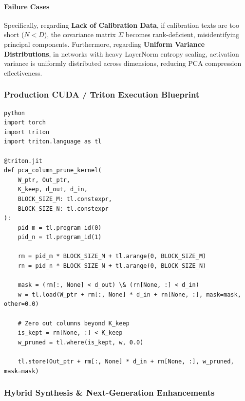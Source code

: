 \paragraph{Failure Cases}

Specifically, regarding \textbf{Lack of Calibration Data}, if calibration texts are too short ($N < D$), the covariance matrix $\Sigma$ becomes rank-deficient, misidentifying principal components. Furthermore, regarding \textbf{Uniform Variance Distributions}, in networks with heavy LayerNorm entropy scaling, activation variance is uniformly distributed across dimensions, reducing PCA compression effectiveness.



\subsubsection*{Production CUDA / Triton Execution Blueprint}

\vspace{0.5em}
\begin{mdframed}[backgroundcolor=codebg, linecolor=codeframe, linewidth=1pt, roundcorner=4pt, innerleftmargin=2pt, innerrightmargin=5pt, innertopmargin=5pt, innerbottommargin=5pt]
\begin{lstlisting}
python
import torch
import triton
import triton.language as tl

@triton.jit
def pca_column_prune_kernel(
    W_ptr, Out_ptr,
    K_keep, d_out, d_in,
    BLOCK_SIZE_M: tl.constexpr,
    BLOCK_SIZE_N: tl.constexpr
):
    pid_m = tl.program_id(0)
    pid_n = tl.program_id(1)

    rm = pid_m * BLOCK_SIZE_M + tl.arange(0, BLOCK_SIZE_M)
    rn = pid_n * BLOCK_SIZE_N + tl.arange(0, BLOCK_SIZE_N)

    mask = (rm[:, None] < d_out) \& (rn[None, :] < d_in)
    w = tl.load(W_ptr + rm[:, None] * d_in + rn[None, :], mask=mask, other=0.0)

    # Zero out columns beyond K_keep
    is_kept = rn[None, :] < K_keep
    w_pruned = tl.where(is_kept, w, 0.0)

    tl.store(Out_ptr + rm[:, None] * d_in + rn[None, :], w_pruned, mask=mask)
\end{lstlisting}
\end{mdframed}
\vspace{0.5em}


\subsubsection*{Hybrid Synthesis \& Next-Generation Enhancements}

